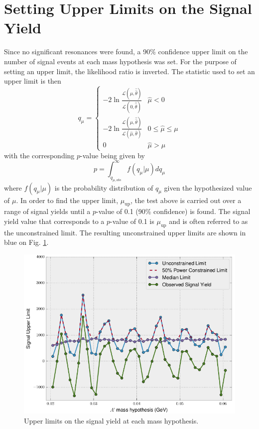\section{Setting Upper Limits on the Signal Yield}

Since no significant resonances were found, a 90\% confidence upper limit on the number
of signal events at each mass hypothesis was set.  For the purpose of setting
an upper limit, the likelihood ratio is inverted.  The statistic used
to set an upper limit is then
\begin{equation}
    q_{\mu} = \begin{cases}
        -2 \ln \frac{\mathcal{L}(\mu, \hat{\hat{\theta}})}{\mathcal{L}(0, \hat{\hat{\theta}})} 
            & \hat{\mu} < 0 \\
        -2 \ln \frac{\mathcal{L}(\mu, \hat{\hat{\theta}})}{\mathcal{L}(\hat{\mu}, \hat{\theta})} 
            & 0 \leq \hat{\mu} \leq \mu \\
             0  & \hat{\mu} > \mu
        \end{cases}
\end{equation}
with the corresponding $p$-value being given by
\begin{equation}
    p = \int_{q_{\mu,obs}}^{\infty} f(q_{\mu} | \mu) dq_{\mu}
\end{equation}
where $f(q_{\mu}|\mu)$ is the probability distribution of $q_{\mu}$ given the
hypothesized value of $\mu$. 
In order to find the upper limit, $\mu_{\text{up}}$, the test above is carried out over a range of
signal yields until a $p$-value of 0.1 (90\% confidence) is found.  The signal
yield value that corresponds to a $p$-value of 0.1 is $\mu_{\text{up}}$
and is often referred to as the unconstrained limit. 
The resulting 
unconstrained upper limits are shown in blue on Fig. \ref{fig:upper_limit}. 
\begin{figure}[t]
    \centering
    \includegraphics[width=\textwidth]{images/upper_limits.png}
    \caption{Upper limits on the signal yield at each mass hypothesis.}
    \label{fig:upper_limit}
\end{figure}

